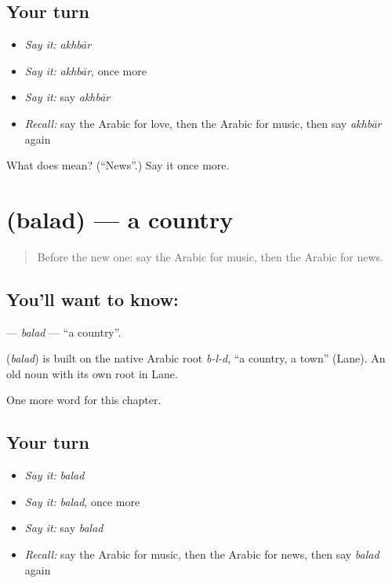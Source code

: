 \subsection*{Your turn}
\begin{itemize}
\raggedright
  \item \emph{Say it:} \emph{akhbār}
  \item \emph{Say it:} \emph{akhbār}, once more
  \item \emph{Say it:} say \emph{akhbār}
  \item \emph{Recall:} say the Arabic for love, then the Arabic for music, then say \emph{akhbār} again
\end{itemize}

\begin{tcolorbox}[breakable,colback=teal!4,colframe=teal!35!black,title={Before you move on}]
What does  mean? (\textquotedblleft{}News\textquotedblright{}.) Say it once more.
\end{tcolorbox}
\section[\texorpdfstring{\ar{بلد} (balad)}{بلد (balad)}]{ (balad) — a country}

\label{lesson:AR-C99-balad}



\begin{quote}
Before the new one: say the Arabic for music, then the Arabic for news.
\end{quote}

\subsection*{You'll want to know: }
\textbf{} — \emph{balad} — \textquotedblleft{}a country\textquotedblright{}.

\begin{cousinweb}
\textbf{} (\emph{balad}) is built on the native Arabic root \emph{b-l-d}, \textquotedblleft{}a country, a town\textquotedblright{} (Lane). An old noun with its own root in Lane.
\end{cousinweb}

\begin{grammarlens}[title={What you've built}]
One more word for this chapter.
\end{grammarlens}

\subsection*{Your turn}
\begin{itemize}
\raggedright
  \item \emph{Say it:} \emph{balad}
  \item \emph{Say it:} \emph{balad}, once more
  \item \emph{Say it:} say \emph{balad}
  \item \emph{Recall:} say the Arabic for music, then the Arabic for news, then say \emph{balad} again
\end{itemize}

